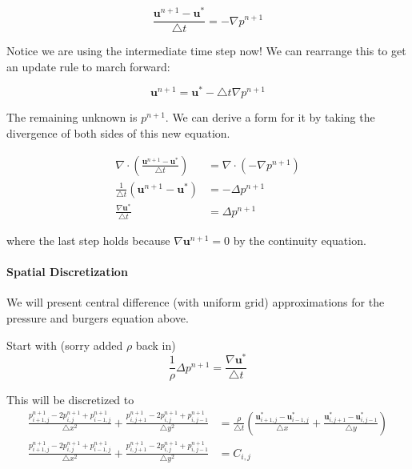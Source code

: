 \documentclass[12pt]{article}
\begin{document}
\begin{equation}
    \frac{\mathbf{u}^{n+1} - \mathbf{u}^*}{\bigtriangleup t} = -\nabla p^{n+1}
\end{equation}

Notice we are using the intermediate time step now! We can rearrange this to get an update rule to march forward:

\begin{equation}
    \mathbf{u}^{n+1} = \mathbf{u}^* - \bigtriangleup t \nabla p^{n+1}
\end{equation}

The remaining unknown is $p^{n+1}$. We can derive a form for it by taking the divergence of both sides of this new equation.

\begin{align*}
    \nabla \cdot (\frac{\mathbf{u}^{n+1} - \mathbf{u}^*}{\bigtriangleup t}) &= \nabla \cdot (-\nabla p^{n+1}) \\
    \frac{1}{\bigtriangleup t}(\mathbf{u}^{n+1} - \mathbf{u}^*) &= -\Delta p^{n+1} \\
    \frac{\nabla \mathbf{u}^*}{\bigtriangleup t} &= \Delta p^{n+1}
\end{align*}

where the last step holds because $\nabla \mathbf{u}^{n+1} = 0$ by the continuity equation.

\paragraph{Spatial Discretization}

We will present central difference (with uniform grid) approximations for the pressure and burgers equation above.

Start with (sorry added $\rho$ back in)
\begin{equation}
\frac{1}{\rho} \Delta p^{n+1} = \frac{\nabla \mathbf{u}^*}{\bigtriangleup t}
\end{equation}

This will be discretized to
\begin{align*}
    \frac{p^{n+1}_{i+1,j} - 2p^{n+1}_{i,j} + p^{n+1}_{i-1,j}}{\bigtriangleup x^2} + \frac{p^{n+1}_{i,j+1} - 2p^{n+1}_{i,j} + p^{n+1}_{i,j-1}}{\bigtriangleup y^2} &= \frac{\rho}{\bigtriangleup t}(\frac{\mathbf{u}^*_{i+1,j} - \mathbf{u}^*_{i-1,j}}{\bigtriangleup x} + \frac{\mathbf{u}^*_{i,j+1} - \mathbf{u}^*_{i,j-1}}{\bigtriangleup y}) \\
    \frac{p^{n+1}_{i+1,j} - 2p^{n+1}_{i,j} + p^{n+1}_{i-1,j}}{\bigtriangleup x^2} + \frac{p^{n+1}_{i,j+1} - 2p^{n+1}_{i,j} + p^{n+1}_{i,j-1}}{\bigtriangleup y^2} &= C_{i,j}
\end{align*}
\end{document}
